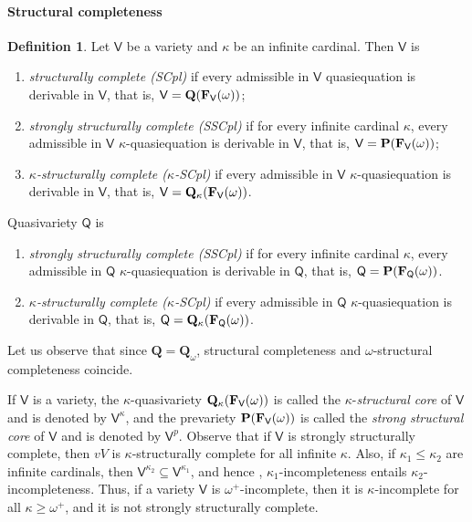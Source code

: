 \documentclass[submission,copyright,creativecommons]{eptcs}
\theoremstyle{definition}
\newtheorem{definition}{Definition}
\newcommand{\alg}[1]{{{\textbf{\upshape #1}}}}
\newcommand{\QQ}{\mathbf{Q}}
\newcommand{\PR}{\mathbf{P}}
\newcommand{\vv}[1]{\mathsf {#1}}
\newcommand{\vV}{\vv V}
\newcommand{\FrV}{\alg F_\vv V(\omega)}
\newcommand{\Def}[1]{\textit{#1}}
\newcommand{\kk}{\kappa}
\newcommand{\Vk}{\vv V^\kk}
\newcommand{\VP}{\vv V^p}
\begin{document}
\paragraph{Structural completeness}




\begin{definition}\label{def-SCpl}
Let $\vv V$ be a variety and $\kappa$ be an infinite cardinal. Then $\vV$ is

\begin{enumerate}
	\item[] \Def{structurally complete (SCpl)} if every admissible in $\vV$ quasiequation is derivable in $\vV$, that is, $ \vv V = \QQ(\FrV)$;
	
	\item[] \Def{strongly structurally complete (SSCpl)} if for every infinite cardinal $\kk$, every admissible in $\vV$ $\kk$-quasiequation is derivable in $\vV$, that is, $\vv V = \PR(\FrV)$;
	
	\item[] \Def{$\kappa$-structurally complete ($\kk$-SCpl)} if every admissible in $\vV$ $\kk$-quasiequation is derivable in $\vV$, that is, $\vv V = \QQ_\kappa(\FrV)$.
	
\end{enumerate}

Quasivariety $\vv Q$ is 

\begin{enumerate}
\item[] \Def{strongly structurally complete (SSCpl)} if for every infinite cardinal $\kk$, every admissible in $\vv{Q}$ $\kk$-quasiequation is derivable in $\vv{Q}$, that is, $\vv Q = \PR(\alg F_\vv Q(\omega))$.

\item[] \Def{$\kk$-structurally complete ($\kk$-SCpl)} if every admissible in $\vv{Q}$ $\kk$-quasiequation is derivable in $\vv{Q}$, that is, $\vv Q = \QQ_\kk(\alg F_\vv Q(\omega))$.

\end{enumerate}
\end{definition}
Let us observe that since $\QQ = \QQ_\omega$, structural completeness and $\omega$-structural completeness coincide.
\smallskip

If $\vv V$ is a variety, the $\kk$-quasivariety $\QQ_\kk(\FrV)$ is called the $\kk$-\Def{structural core} of $\vv V$ and is denoted by $\Vk$, and the prevariety $\PR(\FrV)$ is called the \Def{strong structural core} of $\vv V$ and is denoted by $\VP$. Observe that if $\vV$ is strongly structurally complete, then $vV$ is $\kk$-structurally complete for all infinite $\kk$. Also, if $\kk_1 \leq \kk_2$ are infinite cardinals, then $\vV^{\kk_2} \subseteq \vV^{\kk_1}$, and hence , $\kk_1$-incompleteness entails $\kk_2$-incompleteness. Thus, if a variety $\vV$ is $\omega^+$-incomplete, then it is $\kk$-incomplete for all $\kk \ge \omega^+$, and it is not strongly structurally complete.
\end{document}
